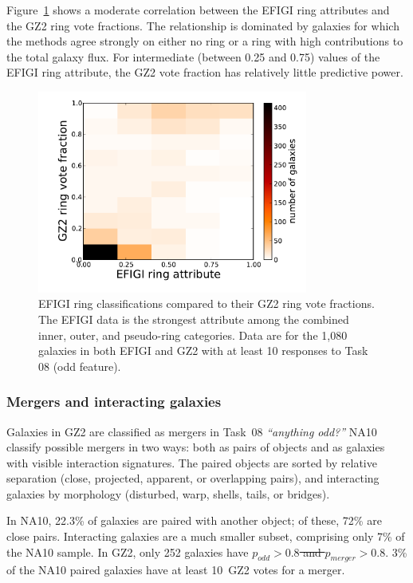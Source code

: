 \documentclass[useAMS,usenatbib]{mn2e}
\providecommand{\DIFaddtex}[1]{{\protect\color{blue}\uwave{#1}}} %
\providecommand{\DIFdeltex}[1]{{\protect\color{red}\sout{#1}}}                      %
\providecommand{\DIFaddbegin}{} %
\providecommand{\DIFaddend}{} %
\providecommand{\DIFdelbegin}{} %
\providecommand{\DIFdelend}{} %
\providecommand{\DIFadd}[1]{\texorpdfstring{\DIFaddtex{#1}}{#1}} %
\providecommand{\DIFdel}[1]{\texorpdfstring{\DIFdeltex{#1}}{}} %
\begin{document}
Figure~\ref{fig-efigi_rings} shows a moderate correlation between the EFIGI ring attributes and the GZ2 ring vote fractions. The relationship is dominated by galaxies for which the methods agree strongly on either no ring or a ring with high contributions to the total galaxy flux. For intermediate (between 0.25 and 0.75) values of the EFIGI ring attribute, the GZ2 vote fraction has relatively little predictive power. %

\begin{figure}
\includegraphics[angle=0,width=3.5in]{figures/efigi_rings.pdf}
\caption{EFIGI ring classifications compared to their GZ2 ring vote fractions. The EFIGI data is the strongest attribute among the combined inner, outer, and pseudo-ring categories. Data are for the 1,080 galaxies in both EFIGI and GZ2 with at least 10 responses to Task 08 (odd feature). 
\label{fig-efigi_rings}}
\end{figure}

\subsubsection{Mergers and interacting galaxies}

Galaxies in GZ2 are classified as mergers in Task~08 {\it ``anything odd?''} NA10 classify possible mergers in two ways: both as pairs of objects and as galaxies with visible interaction signatures. The paired objects are sorted by relative separation (close, projected, apparent, or overlapping pairs), and interacting galaxies by morphology (disturbed, warp, shells, tails, or bridges). 

In NA10, 22.3\% of galaxies are paired with another object; of these, 72\% are close pairs. Interacting galaxies are a much smaller subset, comprising only 7\% of the NA10 sample. In GZ2, only 252 galaxies have \DIFdelbegin \DIFdel{$p_{odd}>0.8$ and $p_{merger}>0.8$}\DIFdelend \DIFaddbegin \DIFadd{$p_\mathrm{odd}>0.8$ and $p_\mathrm{merger}>0.8$}\DIFaddend . 3\% of the NA10 paired galaxies have at least 10~GZ2 votes for a merger. 
\end{document}
